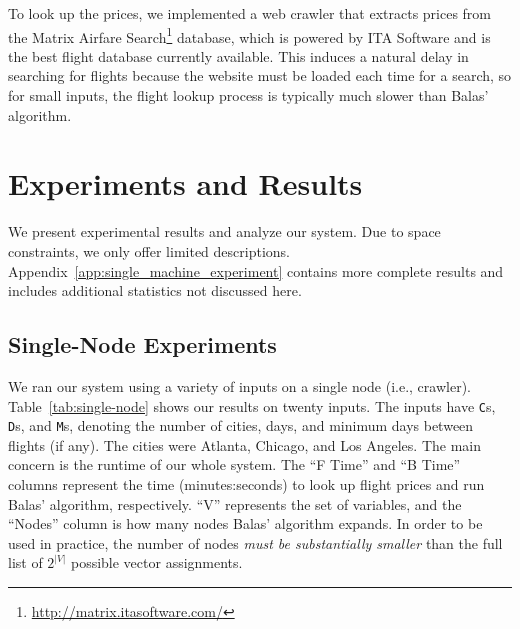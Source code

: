 \documentclass{article}
\begin{document}
To look up the prices, we implemented a web crawler that extracts prices from the Matrix Airfare Search\footnote{\url{http://matrix.itasoftware.com/}}
database, which is powered by ITA Software and is the best flight database currently available. This induces a natural delay in searching for flights
because the website must be loaded each time for a search, so for small inputs, the flight lookup process is typically much slower than Balas'
algorithm.



\section{Experiments and Results}\label{sec:experiments_results}

We present experimental results and analyze our system. Due to space constraints, we only offer limited descriptions.
Appendix~\ref{app:single_machine_experiment} contains more complete results and includes additional statistics not discussed here.

\subsection{Single-Node Experiments}\label{sec:single_experiment}

We ran our system using a variety of inputs on a single node (i.e., crawler). Table~\ref{tab:single-node} shows our results on twenty inputs. The
inputs have \texttt{C}s, \texttt{D}s, and \texttt{M}s, denoting the number of cities, days, and minimum days between flights (if any). The cities were
Atlanta, Chicago, and Los Angeles. The main concern is the runtime of our whole system. The ``F Time'' and ``B Time'' columns represent the time
(minutes:seconds) to look up flight prices and run Balas' algorithm, respectively. ``V'' represents the set of variables, and the ``Nodes'' column is
how many nodes Balas' algorithm expands. In order to be used in practice, the number of nodes \emph{must be substantially smaller} than the full list
of $2^{|V|}$ possible vector assignments.
\end{document}
